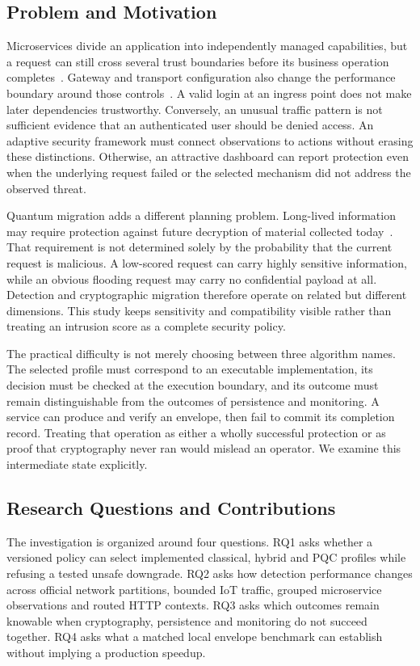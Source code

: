 \documentclass[conference,a4paper]{IEEEtran}
\begin{document}
\subsection{Problem and Motivation}
Microservices divide an application into independently managed capabilities, but a request can still cross several trust boundaries before its business operation completes~\cite{mesh}. Gateway and transport configuration also change the performance boundary around those controls~\cite{gateway}. A valid login at an ingress point does not make later dependencies trustworthy. Conversely, an unusual traffic pattern is not sufficient evidence that an authenticated user should be denied access. An adaptive security framework must connect observations to actions without erasing these distinctions. Otherwise, an attractive dashboard can report protection even when the underlying request failed or the selected mechanism did not address the observed threat.

Quantum migration adds a different planning problem. Long-lived information may require protection against future decryption of material collected today~\cite{readiness,enterprise}. That requirement is not determined solely by the probability that the current request is malicious. A low-scored request can carry highly sensitive information, while an obvious flooding request may carry no confidential payload at all. Detection and cryptographic migration therefore operate on related but different dimensions. This study keeps sensitivity and compatibility visible rather than treating an intrusion score as a complete security policy.

The practical difficulty is not merely choosing between three algorithm names. The selected profile must correspond to an executable implementation, its decision must be checked at the execution boundary, and its outcome must remain distinguishable from the outcomes of persistence and monitoring. A service can produce and verify an envelope, then fail to commit its completion record. Treating that operation as either a wholly successful protection or as proof that cryptography never ran would mislead an operator. We examine this intermediate state explicitly.

\subsection{Research Questions and Contributions}
The investigation is organized around four questions. RQ1 asks whether a versioned policy can select implemented classical, hybrid and PQC profiles while refusing a tested unsafe downgrade. RQ2 asks how detection performance changes across official network partitions, bounded IoT traffic, grouped microservice observations and routed HTTP contexts. RQ3 asks which outcomes remain knowable when cryptography, persistence and monitoring do not succeed together. RQ4 asks what a matched local envelope benchmark can establish without implying a production speedup.
\end{document}
